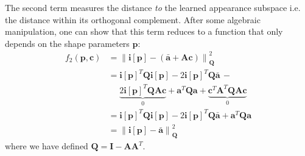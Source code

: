 The second term measures the distance \emph{to} the learned appearance subspace i.e. the distance within its orthogonal complement. After some algebraic manipulation, one can show that this term reduces to a function that only depends on the shape parameters $\mathbf{p}$:
\begin{equation}
    \begin{aligned}
        f_2(\mathbf{p}, \mathbf{c}) & = \left\| \mathbf{i}[\mathbf{p}] - \left( \bar{\mathbf{a}} + \mathbf{A} \mathbf{c} \right) \right\|_{\mathbf{Q}}^2
        \\
        & = \mathbf{i}[\mathbf{p}]^T \mathbf{Q} \mathbf{i}[\mathbf{p}] - 2\mathbf{i}[\mathbf{p}]^T \mathbf{Q} \bar{\mathbf{a}} \, - 
        \\
        & \quad \,\, \underbrace{2\mathbf{i}[\mathbf{p}]^T \mathbf{Q} \mathbf{A}\mathbf{c}}_{0} + \mathbf{a}^T \mathbf{Q} \mathbf{a} + \underbrace{\mathbf{c}^T \mathbf{A}^T \mathbf{Q} \mathbf{A}\mathbf{c}}_{0}
        \\
        & = \mathbf{i}[\mathbf{p}]^T \mathbf{Q} \mathbf{i}[\mathbf{p}] - 2\mathbf{i}[\mathbf{p}]^T \mathbf{Q} \bar{\mathbf{a}} + \mathbf{a}^T \mathbf{Q} \mathbf{a}
        \\
        & = \left\| \mathbf{i}[\mathbf{p}] - \bar{\mathbf{a}} \right\|_{\mathbf{Q}}^2
    \end{aligned}
\end{equation}
where we have defined $\mathbf{Q}= \mathbf{I} -\mathbf{A}\mathbf{A}^T$. 

